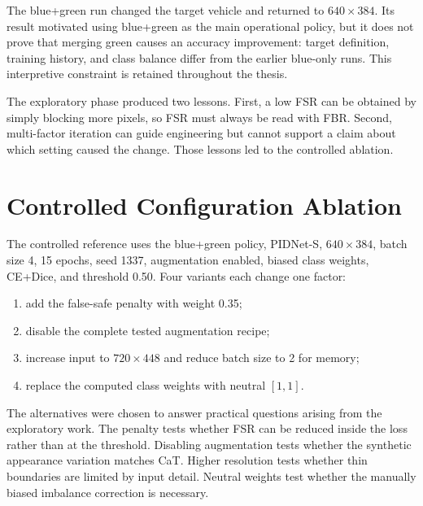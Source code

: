 The blue+green run changed the target vehicle and returned to
$640\times384$. Its result motivated using blue+green as the main operational
policy, but it does not prove that merging green causes an accuracy
improvement: target definition, training history, and class balance differ
from the earlier blue-only runs. This interpretive constraint is retained
throughout the thesis.

The exploratory phase produced two lessons. First, a low FSR can be obtained
by simply blocking more pixels, so FSR must always be read with FBR. Second,
multi-factor iteration can guide engineering but cannot support a claim about
which setting caused the change. Those lessons led to the controlled ablation.

\section{Controlled Configuration Ablation}

The controlled reference uses the blue+green policy, PIDNet-S,
$640\times384$, batch size 4, 15 epochs, seed 1337, augmentation enabled,
biased class weights, CE+Dice, and threshold 0.50. Four variants each change
one factor:
\begin{enumerate}
  \item add the false-safe penalty with weight 0.35;
  \item disable the complete tested augmentation recipe;
  \item increase input to $720\times448$ and reduce batch size to 2 for memory;
  \item replace the computed class weights with neutral $[1,1]$.
\end{enumerate}

The alternatives were chosen to answer practical questions arising from the
exploratory work. The penalty tests whether FSR can be reduced inside the loss
rather than at the threshold. Disabling augmentation tests whether the
synthetic appearance variation matches CaT. Higher resolution tests whether
thin boundaries are limited by input detail. Neutral weights test whether the
manually biased imbalance correction is necessary.

